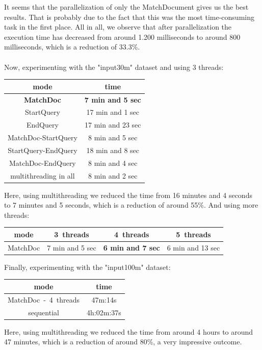 \documentclass{article}
\begin{document}
It seems that the parallelization of only the MatchDocument gives us the best results. That is probably due to the fact that this was the most time-consuming task in the first place.
All in all, we observe that after parallelization the execution time has decreased from around 1.200 milliseconds to around 800 milliseconds, which is a reduction of 33.3\%.
\\ \\
Now, experimenting with the "input30m" dataset and using 3 threads:
\begin{center}
\begin{tabular}{||c c||} 
 \hline
 mode & time\\ 
 \hline
 \hline
 \textbf{MatchDoc} & \textbf{7 min and 5 sec} \\
 \hline
 StartQuery  & 17 min and 1 sec\\
 \hline
 EndQuery  &  17 min and 23 sec \\
 \hline
  MatchDoc-StartQuery  &  8 min and 5 sec \\
 \hline
 StartQuery-EndQuery &  18 min and 8 sec \\
 \hline
 MatchDoc-EndQuery &  8 min and 4 sec \\
 \hline
 multithreading in all & 8 min and 2 sec \\
 \hline
\end{tabular}
\end{center}
Here, using multithreading we reduced the time from 16 minutes and 4 seconds to 7 minutes and 5 seconds, which is a reduction of around 55\%. And using more threads:
\begin{center}
\begin{tabular}{||c c c c||} 
 \hline
 mode & 3\ threads & 4\ threads & 5\ threads\\ 
 \hline
 \hline
 MatchDoc & 7 min and 5 sec & \textbf{6 min and 7 sec} & 6 min and 13 sec\\
 \hline
\end{tabular}
\end{center}
Finally, experimenting with the "input100m" dataset:
\begin{center}
\begin{tabular}{||c c||} 
 \hline
 mode & time\\ 
 \hline
 \hline
 MatchDoc\ -\ 4\ threads & 47m:14s \\
 sequential &  4h:02m:37s\\
 \hline
\end{tabular}
\end{center}
Here, using multithreading we reduced the time from around 4 hours to around 47 minutes, which is a reduction of around  80\%, a very impressive outcome. \\ \\
\end{document}

